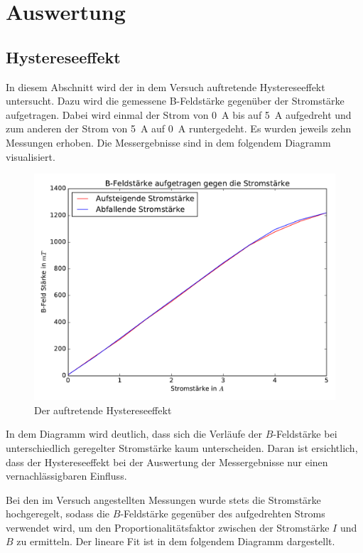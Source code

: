 



\section{Auswertung}

\subsection{Hystereseeffekt}

In diesem Abschnitt wird der in dem Versuch auftretende Hystereseeffekt untersucht.
Dazu wird die gemessene B-Feldstärke gegenüber der Stromstärke aufgetragen. Dabei
wird einmal der Strom von \SI{0}{\ampere} bis auf \SI{5}{\ampere} aufgedreht und zum
anderen der Strom von \SI{5}{\ampere} auf \SI{0}{\ampere} runtergedeht.
Es wurden jeweils zehn Messungen erhoben. Die Messergebnisse sind in dem folgendem
Diagramm visualisiert.

\begin{figure}
  \includegraphics[width=\textwidth]{Hysterese.pdf}
  \caption{Der auftretende Hystereseeffekt}
  \label{fig:Hysterese}
\end{figure}

In dem Diagramm wird deutlich, dass sich die Verläufe der $B$-Feldstärke bei
unterschiedlich geregelter Stromstärke kaum unterscheiden. Daran ist ersichtlich,
dass der Hystereseeffekt bei der Auswertung der Messergebnisse nur einen vernachlässigbaren
Einfluss.

Bei den im Versuch angestellten Messungen wurde stets die Stromstärke hochgeregelt,
sodass die $B$-Feldstärke gegenüber des aufgedrehten Stroms verwendet wird, um
den Proportionalitätsfaktor zwischen der Stromstärke $I$ und $B$ zu ermitteln.
Der lineare Fit ist in dem folgendem Diagramm dargestellt.

